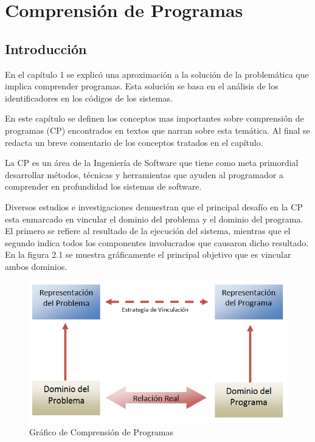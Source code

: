 \documentclass[12pt]{report}
\begin{document}


\chapter{Comprensión de Programas}
\section{Introducción}

En el capítulo 1 se explicó una aproximación a la solución de la problemática que implica comprender programas. Esta solución se basa en el análisis de los identificadores en los códigos de los sistemas.

En este capítulo se definen los conceptos mas importantes sobre comprensión de programas (CP) encontrados en textos que narran sobre esta temática. Al final se redacta un breve comentario de los conceptos tratados en el capítulo.

La CP es un área de la Ingeniería de Software que tiene como meta primordial desarrollar métodos, técnicas y herramientas que ayuden al programador a comprender en profundidad los sistemas de software. 

Diversos estudios e investigaciones demuestran que el principal desafío en la CP esta enmarcado en vincular el dominio del problema y el dominio del programa. El primero se refiere al resultado de la ejecución del sistema, mientras que el segundo indica todos los componentes involucrados que causaron dicho resultado. 
En la figura 2.1 se muestra gráficamente el principal objetivo que es vincular ambos dominios. 

\begin{figure}[h] %
\centering
\includegraphics[scale= 0.50]{./dom.png}
\caption{Gráfico de Comprensión de Programas}
\end{figure} \label{captura1}
\end{document}
